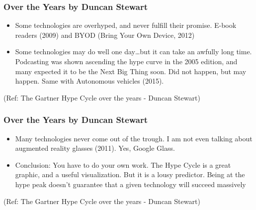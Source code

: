 \begin{frame}[fragile]\frametitle{Over the Years by Duncan Stewart}


\begin{itemize}
\item Some technologies are overhyped, and never fulfill their promise. E-book readers (2009) and BYOD (Bring Your Own Device, 2012)

\item Some technologies may do well one day…but it can take an awfully long time. Podcasting was shown ascending the hype curve in the 2005 edition, and many expected it to be the Next Big Thing soon. Did not happen, but may happen. Same with Autonomous vehicles (2015).
\end{itemize}

{\tiny (Ref: The Gartner Hype Cycle over the years - Duncan Stewart)}


\end{frame}

\begin{frame}[fragile]\frametitle{Over the Years by Duncan Stewart}


\begin{itemize}
\item Many technologies never come out of the trough. I am not even talking about augmented reality glasses (2011). Yes, Google Glass.

\item Conclusion: You have to do your own work. The Hype Cycle is a great graphic, and a useful visualization. But it is a lousy predictor. Being at the hype peak doesn’t guarantee that a given technology will succeed massively
\end{itemize}

{\tiny (Ref: The Gartner Hype Cycle over the years - Duncan Stewart)}


\end{frame}

